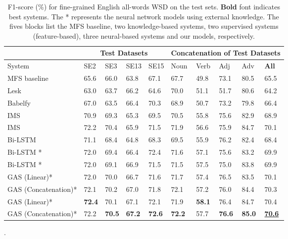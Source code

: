 \documentclass[11pt,a4paper]{article}
\begin{document}
\begin{table*} []
\small \centering
    \begin{tabular}{|l|p{0.5cm} p{0.5cm} p{0.5cm} p{0.65cm}|p{0.55cm} p{0.5cm} p{0.45cm} p{0.55cm}|p{0.6cm}|}
      \hline
& \multicolumn{4}{c|}{Test Datasets} & \multicolumn{5}{c|}{Concatenation of Test Datasets} \\\hline
       System   &  SE2 &  SE3 &  SE13 &  SE15 &  Noun &  Verb &  Adj &  Adv &  \bf All \\\hline
      MFS baseline & 65.6 & 66.0 & 63.8 & 67.1 & 67.7 & 49.8 & 73.1 & 80.5 & 65.5 \\ \hline
      Lesk \cite{Basile2014LeskExt}  & 63.0 & 63.7 & 66.2 & 64.6 & 70.0 & 51.1 & 51.7 & 80.6 & 64.2 \\ 

      Babelfy \cite{Moro2014Babelfy} & 67.0 & 63.5 & 66.4 & 70.3 & 68.9 & 50.7 & 73.2 & 79.8 & 66.4 \\\hline

      IMS \cite{Zhong2010IMS} & 70.9 & 69.3 & 65.3 & 69.5 & 70.5 & 55.8 & 75.6 & 82.9 & 68.9 \\ IMS \cite{Iacobacci2016} & 72.2 & 70.4 & 65.9 & 71.5 & 71.9 & 56.6 & 75.9 & 84.7 & 70.1 \\ \hline

Bi-LSTM \cite{bilstm} & 71.1 & 68.4 & 64.8 & 68.3 & 69.5 & 55.9 & 76.2 & 82.4 & 68.4 \\ Bi-LSTM \cite{Raganato2017}*  & 72.0 & 69.4 & 66.4 &  72.4 &71.6 & 57.1 & 75.6 & 83.2 & 69.9 \\
      Bi-LSTM \cite{Raganato2017}*  & 72.0 & 69.1 & 66.9 & 71.5 &71.5 & 57.5 & 75.0 & 83.8 & 69.9 \\ \hline
      GAS (Linear)* & 72.0 & 70.0 & 66.7 & 71.6 & 71.7 & 57.4 & 76.5 & 83.5 & 70.1 \\
      GAS (Concatenation)* &  72.1 & 70.2 & 67.0 & 71.8 & 72.1 & 57.2 & 76.0 & 84.4 & 70.3 \\
      GAS (Linear)* &   \bf 72.4 & 70.1 & 67.1 & 72.1 & 71.9 & \bf 58.1 &  76.4 &  84.7 & 70.4\\
      GAS (Concatenation)* &  72.2 & \bf70.5 & \bf67.2 & \bf72.6 & \bf72.2 & 57.7 &  \bf 76.6 &  \bf 85.0 & \bf\uline{70.6}
      \\ \hline
\end{tabular}
    \caption{F1-score (\%) for fine-grained English all-words WSD on the test sets.
\textbf{Bold} font indicates best systems. The * represents the neural network models using external knowledge.
    The fives blocks list the MFS baseline, two knowledge-based systems, two supervised systems (feature-based), three neural-based systems and our models, respectively.
    } \label{result1}.
    \vspace{-0.2in}
\end{table*}
\end{document}
